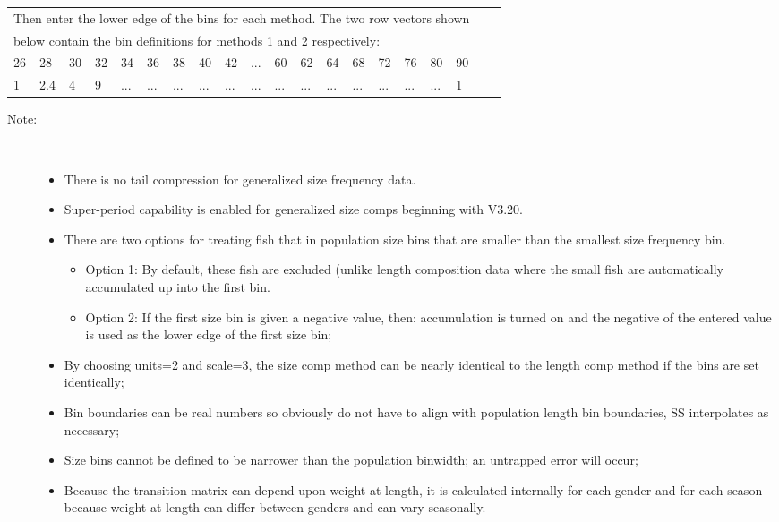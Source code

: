 \begin{center}
	\begin{tabular}{p{0.4cm} p{0.4cm} p{0.4cm} p{0.4cm} p{0.4cm} p{0.4cm} p{0.5cm} p{0.5cm} p{0.5cm} p{0.5cm} p{0.5cm} p{0.5cm} p{0.5cm} p{0.5cm} p{0.5cm} p{0.5cm} p{0.5cm} p{0.5cm} p{0.5cm} p{0.25cm}}
		\multicolumn{18}{l}{Then enter the lower edge of the bins for each method. The two row vectors shown}\\
		\multicolumn{18}{l}{below contain the bin definitions for methods 1 and 2 respectively:}\\
		\hline
		26 & 28 & 30 & 32 & 34 & 36 & 38 & 40 & 42 & ... & 60 & 62 & 64 & 68 & 72 & 76 & 80 & 90\\
		1 & 2.4 & 4 & 9 & ... & ... & ... & ... & ... & ... & ... & ... & ... & ... & ... & ... & ... & 1 \\
		\hline 
	\end{tabular}
\end{center}

\begin{description}
	\item[Note:]\
	\begin{itemize}
		\item There is no tail compression for generalized size frequency data.
		\item Super-period capability is enabled for generalized size comps beginning with V3.20.
		\item There are two options for treating fish that in population size bins that are smaller than the smallest size frequency bin.
		\begin{itemize}
			\item Option 1:  By default, these fish are excluded (unlike length composition data where the small fish are automatically accumulated up into the first bin.
			\item Option 2:  If the first size bin is given a negative value, then:  accumulation is turned on and the negative of the entered value is used as the lower edge of the first size bin;
		\end{itemize}
		\item By choosing units=2 and scale=3, the size comp method can be nearly identical to the length comp method if the bins are set identically;
		\item Bin boundaries can be real numbers so obviously do not have to align with population length bin boundaries, SS interpolates as necessary;
		\item Size bins cannot be defined to be narrower than the population binwidth; an untrapped error will occur;
		\item Because the transition matrix can depend upon weight-at-length, it is calculated internally for each gender and for each season because weight-at-length can differ between genders and can vary seasonally.
	\end{itemize}
\end{description}

